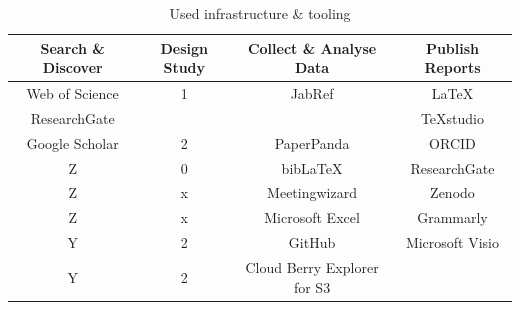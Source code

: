 \begin{table}[!h]
	\begin{center}
		\begin{tabular}{@{}cccc@{}}
			\toprule
			Search \& Discover & Design Study & Collect \& Analyse Data & Publish Reports\\ \midrule
			Web of Science & 1    & JabRef   & \LaTeX \\%
			ResearchGate   &      &           & TeXstudio \\%
			Google Scholar & 2    & PaperPanda  & ORCID \\%
			Z	 & 0    & bib\LaTeX   & ResearchGate \\%
			Z	 &	x	& Meetingwizard	  & Zenodo \\%
			Z	 &	x	& Microsoft Excel  & Grammarly \\%
			Y    & 2    & GitHub  & Microsoft Visio \\%
			Y	 & 2	& Cloud Berry Explorer for S3 & \\%
			\bottomrule
		\end{tabular}
		\caption{Used infrastructure \& tooling}
		\label{tab:usedinfrastructuretooling}
	\end{center}
\end{table}